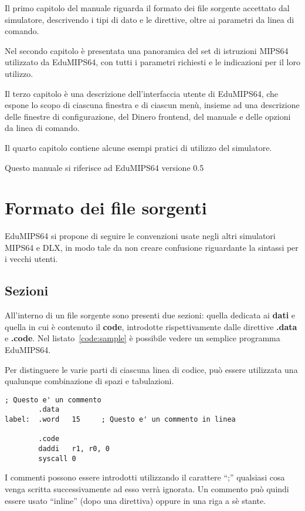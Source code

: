 \documentclass[12pt]{report}
\newcommand{\EM}{EduMIPS64}
\newcommand{\EV}{0.5}
\newcommand{\MS}{MIPS64}
\begin{document}
Il primo capitolo del manuale riguarda il formato dei file sorgente accettato
dal simulatore, descrivendo i tipi di dato e le direttive, oltre ai parametri da
linea di comando.

Nel secondo capitolo \`{e} presentata una panoramica del set di istruzioni
\MS{} utilizzato da \EM{}, con tutti i parametri richiesti e le indicazioni per
il loro utilizzo.

Il terzo capitolo \`{e} una descrizione dell'interfaccia utente di \EM{}, che
espone lo scopo di ciascuna finestra e di ciascun men\`{u}, insieme ad una
descrizione delle finestre di configurazione, del Dinero frontend, del manuale e
delle opzioni da linea di comando. 

Il quarto capitolo contiene alcune esempi pratici di utilizzo del simulatore.

Questo manuale si riferisce ad EduMIPS64 versione \EV{}

\chapter{Formato dei file sorgenti}
\EM{} si propone di seguire le convenzioni usate negli altri simulatori \MS{} e DLX, 
in modo tale da non creare confusione riguardante la sintassi per i vecchi utenti.

\section{Sezioni}
All'interno di un file sorgente sono presenti due sezioni: quella dedicata ai \textbf{dati} 
e quella in cui \`{e} contenuto il \textbf{code}, introdotte rispettivamente dalle direttive \textbf{.data} e
\textbf{.code}. Nel listato~\ref{code:sample} \`{e} possibile vedere un semplice programma 
\EM{}.

Per distinguere le varie parti di ciascuna linea di codice, pu\`{o} essere utilizzata una qualunque combinazione di spazi e tabulazioni.

\begin{lstlisting}[caption={Esempio di codice \EM{}}, label={code:sample}, style={mips}]
; Questo e' un commento
        .data
label:  .word   15     ; Questo e' un commento in linea

        .code
        daddi   r1, r0, 0
        syscall 0
\end{lstlisting}

\index{;}
I commenti possono essere introdotti utilizzando il carattere ``;'' qualsiasi
cosa venga scritta successivamente ad esso verr\`{a} ignorata.  Un commento
pu\`{o} quindi essere usato ``inline'' (dopo una direttiva) oppure in una riga a
s\`{e} stante.
\end{document}
